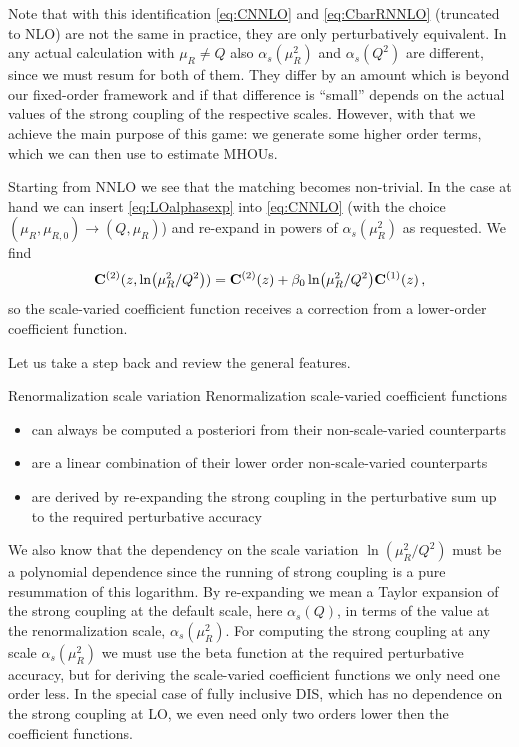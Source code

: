 Note that with this identification \cref{eq:CNNLO} and \cref{eq:CbarRNNLO} (truncated to NLO) are not the same in practice, they are only perturbatively equivalent.
In any actual calculation with $\mu_R\neq Q$ also $\alpha_s(\mu_R^2)$ and $\alpha_s(Q^2)$ are different, since we must resum for both of them.
They differ by an amount which is beyond our fixed-order framework and if that difference is \enquote{small} depends on the actual values of the strong coupling of the respective scales.
However, with that we achieve the main purpose of this game: we generate some higher order terms, which we can then use to estimate MHOUs.

Starting from NNLO we see that the matching becomes non-trivial.
In the case at hand we can insert \cref{eq:LOalphasexp} into \cref{eq:CNNLO} (with the choice $(\mu_R,\mu_{R,0})\to (Q,\mu_R)$) and re-expand in powers of $\alpha_s(\mu_R^2)$ as requested.
We find
\begin{equation}
    \vb C^{(2)}(z,\ln(\mu_R^2/Q^2)) = \vb C^{(2)}(z) + \beta_0 \ln(\mu_R^2/Q^2) \vb C^{(1)}(z)\,, \label{eq:CbarRimpl}
\end{equation}
so the scale-varied coefficient function receives a correction from a lower-order coefficient function.

Let us take a step back and review the general features.
\begin{conclusionbox}[label={box:svren}]{Renormalization scale variation}
    Renormalization scale-varied coefficient functions
    \begin{itemize}
        \item can always be computed a posteriori from their non-scale-varied counterparts
        \item are a linear combination of their lower order non-scale-varied counterparts
        \item are derived by re-expanding the strong coupling in the perturbative sum up to the required perturbative accuracy
    \end{itemize}
\end{conclusionbox}
We also know that the dependency on the scale variation $\ln(\mu_R^2/Q^2)$ must be a polynomial dependence since the running of strong coupling is a pure resummation of this logarithm.
By re-expanding we mean a Taylor expansion of the strong coupling at the default scale, here $\alpha_s(Q)$, in terms of the value at the renormalization scale, $\alpha_s(\mu_R^2)$.
For computing the strong coupling at any scale $\alpha_s(\mu_R^2)$ we must use the beta function at the required perturbative accuracy, but for deriving the scale-varied coefficient functions we only need one order less.
In the special case of fully inclusive DIS, which has no dependence on the strong coupling at LO, we even need only two orders lower then the coefficient functions.

